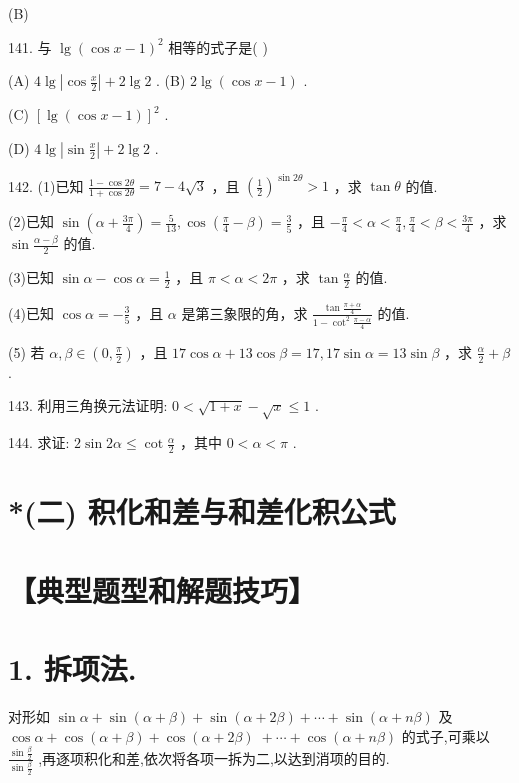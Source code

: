 \documentclass[10pt]{article}
\begin{document}
(B)

141. 与 \(\lg {\left( \cos x - 1\right) }^{2}\) 相等的式子是( )

(A) \(4\lg \left| {\cos \frac{x}{2}}\right|  + 2\lg 2\) . (B) \(2\lg \left( {\cos x - 1}\right)\) .

(C) \({\left\lbrack  \lg \left( \cos x - 1\right) \right\rbrack  }^{2}\) .

(D) \(4\lg \left| {\sin \frac{x}{2}}\right|  + 2\lg 2\) .

142. (1)已知 \(\frac{1 - \cos {2\theta }}{1 + \cos {2\theta }} = 7 - 4\sqrt{3}\) ，且 \({\left( \frac{1}{2}\right) }^{\sin {2\theta }} > 1\) ，求 \(\tan \theta\) 的值.

(2)已知 \(\sin \left( {\alpha  + \frac{3\pi }{4}}\right)  = \frac{5}{13},\cos \left( {\frac{\pi }{4} - \beta }\right)  = \frac{3}{5}\) ，且 \(- \frac{\pi }{4} < \alpha  < \frac{\pi }{4},\frac{\pi }{4} < \beta  < \frac{3\pi }{4}\) ，求 \(\sin \frac{\alpha  - \beta }{2}\) 的值.

(3)已知 \(\sin \alpha  - \cos \alpha  = \frac{1}{2}\) ，且 \(\pi  < \alpha  < {2\pi }\) ，求 \(\tan \frac{\alpha }{2}\) 的值.

(4)已知 \(\cos \alpha  =  - \frac{3}{5}\) ，且 \(\alpha\) 是第三象限的角，求 \(\frac{\tan \frac{\pi  + \alpha }{4}}{1 - {\cot }^{2}\frac{\pi  - \alpha }{4}}\) 的值.

(5) 若 \(\alpha ,\beta  \in  \left( {0,\frac{\pi }{2}}\right)\) ，且 \({17}\cos \alpha  + {13}\cos \beta  = {17},{17}\sin \alpha  = {13}\sin \beta\) ，求 \(\frac{\alpha }{2} + \beta\) .

143. 利用三角换元法证明: \(0 < \sqrt{1 + x} - \sqrt{x} \leq  1\) .

144. 求证: \({2\sin {2\alpha } \leq  \cot \frac{\alpha }{2}}\) ，其中 \(0 < \alpha  < \pi\) .

\section*{*(二) 积化和差与和差化积公式}

\section*{【典型题型和解题技巧】}

\section*{1. 拆项法.}

对形如 \(\sin \alpha  + \sin \left( {\alpha  + \beta }\right)  + \sin \left( {\alpha  + {2\beta }}\right)  + \cdots  + \sin \left( {\alpha  + {n\beta }}\right)\) 及 \(\cos \alpha  + \cos \left( {\alpha  + \beta }\right)  + \cos \left( {\alpha  + {2\beta }}\right) \; + \cdots  + \cos \left( {\alpha  + {n\beta }}\right)\) 的式子,可乘以 \(\frac{\sin \frac{\beta }{2}}{\sin \frac{\beta }{2}}\) ,再逐项积化和差,依次将各项一拆为二,以达到消项的目的.
\end{document}
